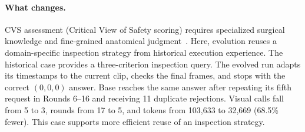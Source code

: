 \paragraph{What changes.}
CVS assessment (Critical View of Safety scoring) requires specialized surgical knowledge and fine-grained anatomical judgment~\citep{su2026medgrpo}. Here, evolution reuses a domain-specific inspection strategy from historical execution experience. The historical case provides a three-criterion inspection query. The evolved run adapts its timestamps to the current clip, checks the final frames, and stops with the correct $(0,0,0)$ answer. Base reaches the same answer after repeating its fifth request in Rounds 6--16 and receiving 11 duplicate rejections. Visual calls fall from 5 to 3, rounds from 17 to 5, and tokens from 103,633 to 32,669 (68.5\% fewer). This case supports more efficient reuse of an inspection strategy.
